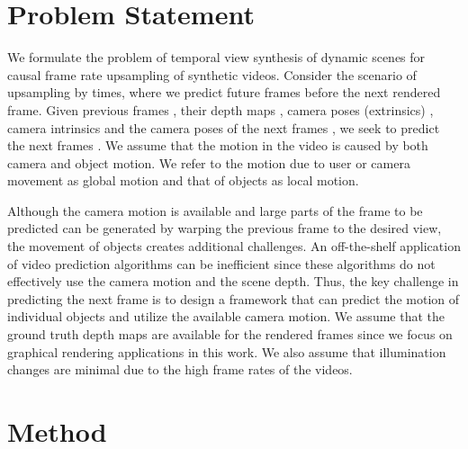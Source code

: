 \documentclass[preprint]{vgtc}
\begin{document}
    \section{Problem Statement}\label{sec:problem-statement}
    We formulate the problem of temporal view synthesis of dynamic scenes for causal frame rate upsampling of synthetic videos.
    Consider the scenario of upsampling by  times, where we predict  future frames before the next rendered frame.
    Given previous frames , their depth maps , camera poses (extrinsics) , camera intrinsics  and the camera poses of the next frames , we seek to predict the next frames .
    We assume that the motion in the video is caused by both camera and object motion.
    We refer to the motion due to user or camera movement as global motion and that of objects as local motion.

    Although the camera motion is available and large parts of the frame to be predicted can be generated by warping the previous frame to the desired view, the movement of objects creates additional challenges.
    An off-the-shelf application of video prediction algorithms can be inefficient since these algorithms do not effectively use the camera motion and the scene depth.
    Thus, the key challenge in predicting the next frame is to design a framework that can predict the motion of individual objects and utilize the available camera motion.
We assume that the ground truth depth maps are available for the rendered frames since we focus on graphical rendering applications in this work.
We also assume that illumination changes are minimal due to the high frame rates of the videos.


    \section{Method}\label{sec:method}
\end{document}
